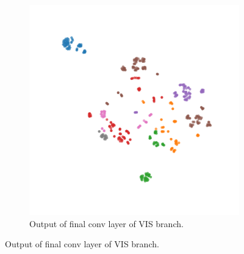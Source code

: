 \documentclass{l4proj}
\begin{document}
\begin{figure}[ht]
\begin{subfigure}[h!]{0.4\textwidth}
    \includegraphics[width=\textwidth, trim={1cm 1cm 1cm 1cm}, clip]{images/evaluation/embedding/val/vis}
    \caption{Output of final conv layer of VIS branch.}
    \label{fig:test_tsne_vis}
  \end{subfigure}


\end{figure}
\end{document}
